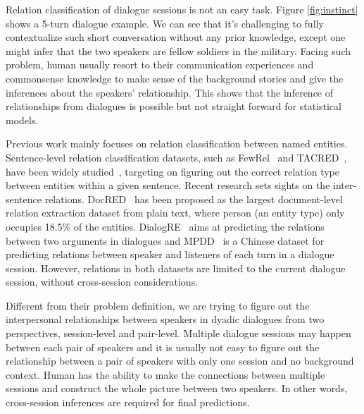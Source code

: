 Relation classification of dialogue sessions is not an easy task. Figure \ref{fig:instinct} shows a 5-turn dialogue example. We can see that it's challenging to fully contextualize such short conversation without any prior knowledge, 
except one might infer that the two speakers are fellow soldiers 
in the military. Facing such problem, human usually resort to their 
communication experiences and commonsense knowledge to make sense of the background stories and give the inferences about the speakers' relationship. This shows that the inference of relationships from dialogues is possible but not straight forward for statistical models.

Previous work mainly focuses on relation classification between named entities. 
Sentence-level relation classification datasets, such as FewRel~\cite{HanZYWYLS18} and  TACRED~\cite{ZhangZCAM17}, have been widely studied~\cite{Zhang0M18,GaoH0S19,ZhangHLJSL19}, targeting on figuring out the correct relation type between entities within a given sentence. Recent research sets sights on the 
inter-sentence relations. DocRED~\cite{YaoYLHLLLHZS19} has been proposed 
as the largest document-level relation extraction dataset from plain text, 
where person (an entity type) only occupies 18.5\% of the entities. 
DialogRE~\cite{YuSCY20} aims at predicting the relations between two arguments 
in dialogues and MPDD~\cite{ChenHC20} is a Chinese dataset for predicting relations between speaker and listeners of each turn in a dialogue session.
However, relations in both datasets are limited to the current dialogue session, without cross-session considerations.
%

Different from their problem definition, we are trying to figure out the interpersonal 
relationships between speakers in dyadic dialogues from two perspectives, session-level and pair-level.
Multiple dialogue sessions may happen between each pair of speakers and 
it is usually not easy to figure out the relationship between 
a pair of speakers with only one session and no background context. 
Human has the ability to make the connections between multiple sessions 
and construct the whole picture between two speakers. 
In other words, cross-session inferences are required for final predictions. 

